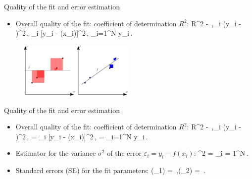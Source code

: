 \documentclass[10pt,aspectratio=169,handout]{beamer}
\begin{document}
\begin{frame}{Quality of the fit and error estimation}
	\begin{itemize}
		\item Overall quality of the fit: coefficient of determination $R^2$:
		\bea
			R^2  - \,,\equiv \sum_i (y_i - )^2\,, \equiv \sum_i [y_i - \fhat(x_i)]^2\,,\quad {} \equiv {}\sum_{i=1}^N y_i\,.
		\eea
	\end{itemize}
\begin{figure}
	\centering
	\includegraphics[width=0.5\textwidth]{fig/rsq}
\end{figure}
\end{frame}


\begin{frame}{Quality of the fit and error estimation}
	\begin{itemize}[<+->]
		\item Overall quality of the fit: coefficient of determination $R^2$:
		\bea
		R^2  - \,,\equiv \sum_i (y_i - )^2\,, = \sum_i [y_i - \fhat(x_i)]^2\,,\quad {} = \sum_{i=1}^N y_i\,.
		\eea
		\item Estimator for the variance $\sigma^2$ of the error $\varepsilon_i = y_i - f(x_i)$:
		\bea
		\sigmahat^2 = \sum_{i = 1}^N\,.
		\eea
		\item Standard errors (SE) for the fit parameters:
		\bea
			(\betahat_1) = \sigmahat{}\,,\quad {}(\betahat_2) = \sigmahat{}\,.
		\eea
	\end{itemize}

\end{frame}
\end{document}
